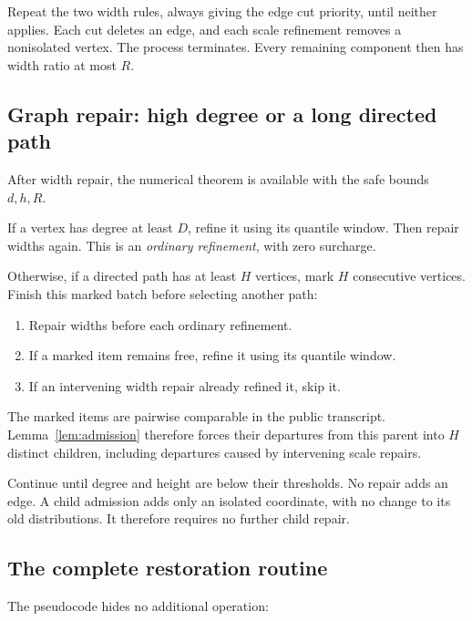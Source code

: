 Repeat the two width rules, always giving the edge cut priority, until neither applies. Each cut deletes an edge, and each scale refinement removes a nonisolated vertex. The process terminates. Every remaining component then has width ratio at most \(R\).

\subsection{Graph repair: high degree or a long directed path}

After width repair, the numerical theorem is available with the safe bounds \(d,h,R\).

If a vertex has degree at least \(D\), refine it using its quantile window. Then repair widths again. This is an \emph{ordinary refinement}, with zero surcharge.

Otherwise, if a directed path has at least \(H\) vertices, mark \(H\) consecutive vertices. Finish this marked batch before selecting another path:
\begin{enumerate}
\item Repair widths before each ordinary refinement.
\item If a marked item remains free, refine it using its quantile window.
\item If an intervening width repair already refined it, skip it.
\end{enumerate}
The marked items are pairwise comparable in the public transcript. Lemma~\ref{lem:admission} therefore forces their departures from this parent into \(H\) distinct children, including departures caused by intervening scale repairs.

Continue until degree and height are below their thresholds. No repair adds an edge. A child admission adds only an isolated coordinate, with no change to its old distributions. It therefore requires no further child repair.


\subsection{The complete restoration routine}

The pseudocode hides no additional operation:

